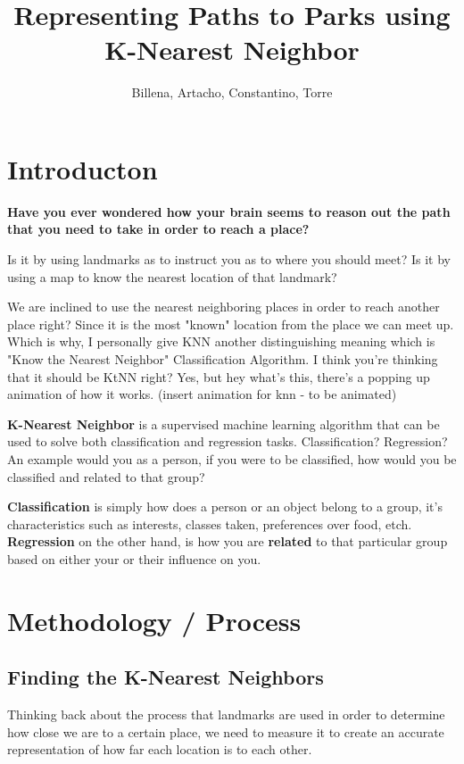 \documentclass[letterpaper, 12pt]{article}
\author{Billena, Artacho, Constantino, Torre}
\title{Representing Paths to Parks using K-Nearest Neighbor}
\begin{document}
    \maketitle
    \section*{Introducton}  
    \textbf{Have you ever wondered how your brain seems to reason out the path that you need to take in order to reach a place?} 
    \par{Is it by using landmarks as to instruct you as to where you should meet? Is it by using a map to know the nearest location of that landmark?} 
    \par We are inclined to use the nearest neighboring places in order to reach another place right? Since it is the most "known" location from the place we can meet up. Which is why, I personally give KNN another distinguishing meaning which is "Know the Nearest Neighbor" Classification Algorithm. I think you're thinking that it should be KtNN right? Yes, but hey what's this, there's a popping up animation of how it works. (insert animation for knn - to be animated)
    \par \textbf{K-Nearest Neighbor} is a supervised machine learning algorithm that can be used to solve both classification and regression tasks. Classification? Regression? An example would you as a person, if you were to be classified, how would you be classified and related to that group?
    \par \textbf{Classification} is simply how does a person or an object belong to a group, it's characteristics such as interests, classes taken, preferences over food, etch. \textbf{Regression} on the other hand, is how you are \textbf{related} to that particular group based on either your or their influence on you.

    \section*{Methodology / Process}
    \subsection*{Finding the K-Nearest Neighbors}
        \par Thinking back about the process that landmarks are used in order to determine how close we are to a certain place, we need to measure it to create an accurate representation of how far each location is to each other. 
\end{document}
